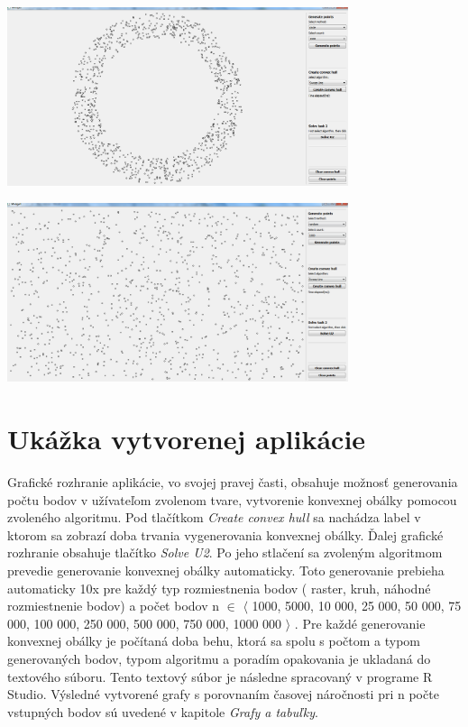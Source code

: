 \documentclass[12pt]{article}
\begin{document}
\begin{center}
   \includegraphics[width=10cm]{./img/points_generate_circle_1000.png}
\end{center}

\begin{center}
   \includegraphics[width=10cm]{./img/points_generate_random_1000.png}
\end{center}

\clearpage 
\section{Ukážka vytvorenej aplikácie}

Grafické rozhranie aplikácie, vo svojej pravej časti, obsahuje možnosť generovania počtu bodov v užívateľom zvolenom tvare, vytvorenie konvexnej obálky pomocou zvoleného algoritmu. Pod tlačítkom \textit{Create convex hull} sa nachádza label v ktorom sa zobrazí doba trvania vygenerovania konvexnej obálky. Ďalej grafické rozhranie obsahuje tlačítko  \textit{Solve U2}. Po jeho stlačení sa zvoleným algoritmom prevedie generovanie konvexnej obálky automaticky. Toto generovanie prebieha automaticky 10x pre každý typ rozmiestnenia bodov ( raster, kruh, náhodné rozmiestnenie bodov) a počet bodov n $\in$ $\langle$ 1000, 5000, 10 000, 25 000, 50 000, 75 000, 100 000, 250 000, 500 000, 750 000, 1000 000 $\rangle$ . Pre každé generovanie konvexnej obálky je počítaná doba behu, ktorá sa spolu s počtom a typom generovaných bodov, typom algoritmu a poradím opakovania je ukladaná do textového súboru. Tento textový súbor je následne spracovaný v programe R Studio. Výsledné vytvorené grafy s porovnaním časovej náročnosti pri n počte vstupných bodov sú uvedené v kapitole \textit{Grafy a tabuľky}. 
\end{document}
